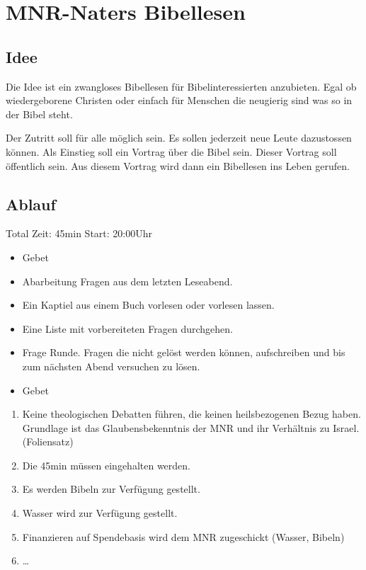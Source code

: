 \documentclass{../inc/mybib}
\begin{document}
    
    \section{MNR-Naters Bibellesen}
    \subsection{Idee}
    Die Idee ist ein zwangloses Bibellesen für Bibelinteressierten anzubieten. Egal ob wiedergeborene Christen oder einfach für Menschen die neugierig sind was so in der Bibel steht.

    Der Zutritt soll für alle möglich sein. Es sollen jederzeit neue Leute dazustossen können. Als Einstieg soll ein Vortrag über die Bibel sein. Dieser Vortrag soll öffentlich sein. Aus diesem Vortrag wird dann ein Bibellesen ins Leben gerufen.

    \subsection{Ablauf}
    Total Zeit: 45min
    Start: 20:00Uhr
    \begin{itemize}
        \item Gebet
        \item Abarbeitung Fragen aus dem letzten Leseabend.
        \item Ein Kaptiel aus einem Buch vorlesen oder vorlesen lassen.
        \item Eine Liste mit vorbereiteten Fragen durchgehen.
        \item Frage Runde. Fragen die nicht gelöst werden können, aufschreiben und bis zum nächsten Abend versuchen zu lösen.
        \item Gebet
    \end{itemize}
    \begin{enumerate}
        \item Keine theologischen Debatten führen, die keinen heilsbezogenen Bezug haben. Grundlage ist das Glaubensbekenntnis der MNR und ihr Verhältnis zu Israel. (Foliensatz)
        \item Die 45min müssen eingehalten werden.
        \item Es werden Bibeln zur Verfügung gestellt.
        \item Wasser wird zur Verfügung gestellt.
        \item Finanzieren auf Spendebasis wird dem MNR zugeschickt (Wasser, Bibeln)
        \item \dots       
    \end{enumerate}
    
\end{document}

